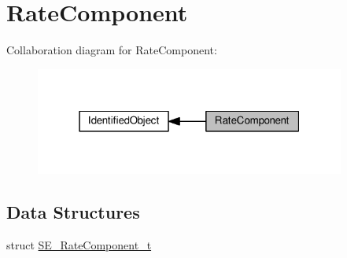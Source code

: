 \hypertarget{group__RateComponent}{}\section{Rate\+Component}
\label{group__RateComponent}
Collaboration diagram for Rate\+Component\+:\nopagebreak
\begin{figure}[H]
\begin{center}
\leavevmode
\includegraphics[width=289pt]{group__RateComponent}
\end{center}
\end{figure}
\subsection*{Data Structures}
\begin{DoxyCompactItemize}
\item 
struct \hyperlink{structSE__RateComponent__t}{S\+E\+\_\+\+Rate\+Component\+\_\+t}
\end{DoxyCompactItemize}
